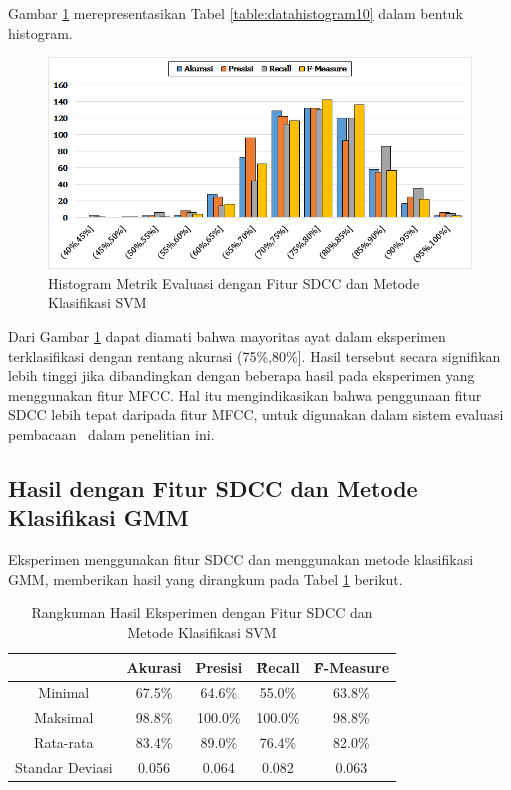   Gambar \ref{fig:histogram10} merepresentasikan Tabel \ref{table:datahistogram10} dalam bentuk histogram.
  \begin{figure}
    \centering
    \includegraphics[width=\linewidth]{pics/histogram10}
    \caption{Histogram Metrik Evaluasi dengan Fitur SDCC dan Metode Klasifikasi SVM}
    \label{fig:histogram10}
  \end{figure}

  Dari Gambar \ref{fig:histogram10} dapat diamati bahwa mayoritas ayat dalam eksperimen terklasifikasi dengan rentang akurasi (75\%,80\%]. Hasil tersebut secara signifikan lebih tinggi jika dibandingkan dengan beberapa hasil pada eksperimen yang menggunakan fitur MFCC. Hal itu mengindikasikan bahwa penggunaan fitur SDCC lebih tepat daripada fitur MFCC, untuk digunakan dalam sistem evaluasi pembacaan \quran~dalam penelitian ini.





  \subsection{Hasil dengan Fitur SDCC dan Metode Klasifikasi GMM}
  Eksperimen menggunakan fitur SDCC dan menggunakan metode klasifikasi GMM, memberikan hasil yang dirangkum pada Tabel \ref{table:sdccgmm} berikut.

  \begin{table}
    \centering
    \caption{Rangkuman Hasil Eksperimen dengan Fitur SDCC dan Metode Klasifikasi SVM}
    \begin{tabular}{|c|c|c|c|c|}
      \hline
       & Akurasi & Presisi & \f{\f{Recall}} & \f{\f{F-Measure}} \\ \hline
      Minimal         & 67.5\% & 64.6\%  & 55.0\%  & 63.8\% \\ \hline
      Maksimal        & 98.8\% & 100.0\% & 100.0\% & 98.8\% \\ \hline
      Rata-rata       & 83.4\% & 89.0\%  & 76.4\%  & 82.0\% \\ \hline
      Standar Deviasi & 0.056  & 0.064   & 0.082   & 0.063  \\ \hline
    \end{tabular}
    \label{table:sdccgmm}
  \end{table}

